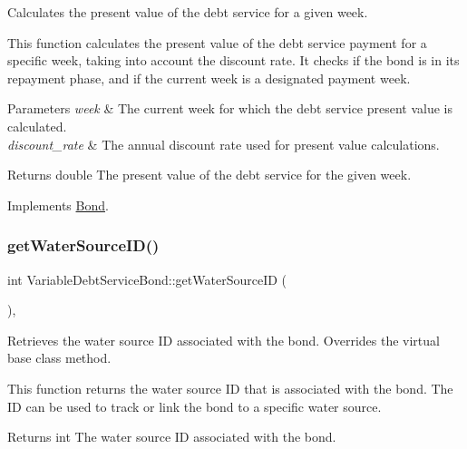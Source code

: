 Calculates the present value of the debt service for a given week. 

This function calculates the present value of the debt service payment for a specific week, taking into account the discount rate. It checks if the bond is in its repayment phase, and if the current week is a designated payment week.


\begin{DoxyParams}{Parameters}
{\em week} & The current week for which the debt service present value is calculated. \\
\hline
{\em discount\+\_\+rate} & The annual discount rate used for present value calculations.\\
\hline
\end{DoxyParams}
\begin{DoxyReturn}{Returns}
double The present value of the debt service for the given week. 
\end{DoxyReturn}


Implements \mbox{\hyperlink{classBond_a322d4ab0c0c72824ac4df5df80f14d24}{Bond}}.

\mbox{\label{classVariableDebtServiceBond_a3edee29f26e8ac74f9767770c6a951c9}} 
\subsubsection{\texorpdfstring{get\+Water\+Source\+I\+D()}{getWaterSourceID()}}
{\footnotesize\ttfamily int Variable\+Debt\+Service\+Bond\+::get\+Water\+Source\+ID (\begin{DoxyParamCaption}{ }\end{DoxyParamCaption})\hspace{0.3cm}{\ttfamily [override]}, {\ttfamily [virtual]}}



Retrieves the water source ID associated with the bond. Overrides the virtual base class method. 

This function returns the water source ID that is associated with the bond. The ID can be used to track or link the bond to a specific water source.

\begin{DoxyReturn}{Returns}
int The water source ID associated with the bond. 
\end{DoxyReturn}


